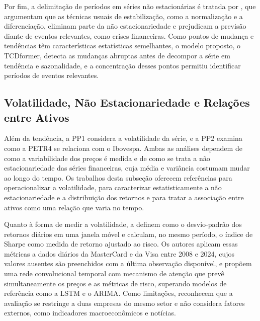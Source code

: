 \documentclass[12pt,a4paper]{article}
\begin{document}
Por fim, a delimitação de períodos em séries não estacionárias é tratada por \textcite{wan_tcdformer_2024}, que argumentam que as técnicas usuais de estabilização, como a normalização e a diferenciação, eliminam parte da não estacionariedade e prejudicam a previsão diante de eventos relevantes, como crises financeiras. Como pontos de mudança e tendências têm características estatísticas semelhantes, o modelo proposto, o TCDformer, detecta as mudanças abruptas antes de decompor a série em tendência e sazonalidade, e a concentração desses pontos permitiu identificar períodos de eventos relevantes.

\subsection{Volatilidade, Não Estacionariedade e Relações entre Ativos}\label{sec:tr-volatilidade}

Além da tendência, a PP1 considera a volatilidade da série, e a PP2 examina como a PETR4 se relaciona com o Ibovespa. Ambas as análises dependem de como a variabilidade dos preços é medida e de como se trata a não estacionariedade das séries financeiras, cuja média e variância costumam mudar ao longo do tempo. Os trabalhos desta subseção oferecem referências para operacionalizar a volatilidade, para caracterizar estatisticamente a não estacionariedade e a distribuição dos retornos e para tratar a associação entre ativos como uma relação que varia no tempo.

Quanto à forma de medir a volatilidade, \textcite{biswas_dual_2025} a definem como o desvio-padrão dos retornos diários em uma janela móvel e calculam, no mesmo período, o índice de Sharpe como medida de retorno ajustado ao risco. Os autores aplicam essas métricas a dados diários da MasterCard e da Visa entre 2008 e 2024, cujos valores ausentes são preenchidos com a última observação disponível, e propõem uma rede convolucional temporal com mecanismo de atenção que prevê simultaneamente os preços e as métricas de risco, superando modelos de referência como a LSTM e o ARIMA. Como limitações, reconhecem que a avaliação se restringe a duas empresas do mesmo setor e não considera fatores externos, como indicadores macroeconômicos e notícias.
\end{document}
